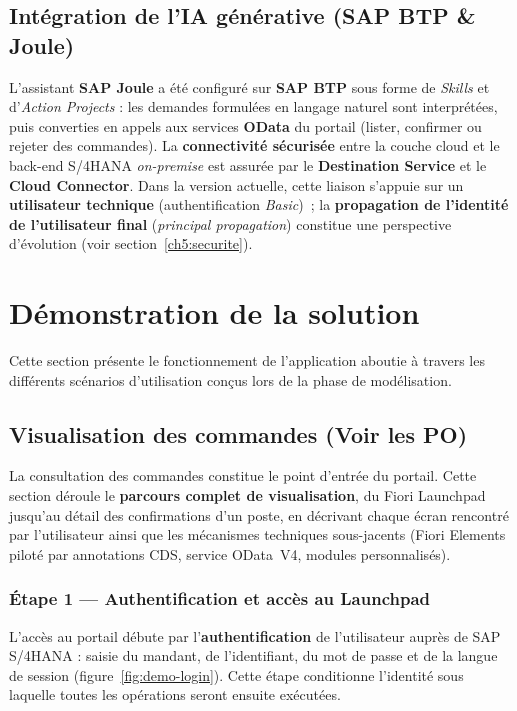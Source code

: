 \documentclass[12pt,a4paper,oneside]{report}
\begin{document}
\subsection{Intégration de l'IA générative (SAP BTP \& Joule)}\label{ch5:joule-impl}
L'assistant \textbf{SAP Joule} a été configuré sur \textbf{SAP BTP} sous forme de
\textit{Skills} et d'\textit{Action Projects} : les demandes formulées en langage naturel
sont interprétées, puis converties en appels aux services \textbf{OData} du portail
(lister, confirmer ou rejeter des commandes). La \textbf{connectivité sécurisée} entre la
couche cloud et le back-end S/4HANA \textit{on-premise} est assurée par le
\textbf{Destination Service} et le \textbf{Cloud Connector}. Dans la version actuelle,
cette liaison s'appuie sur un \textbf{utilisateur technique} (authentification \textit{Basic})~;
la \textbf{propagation de l'identité de l'utilisateur final} (\textit{principal
propagation}) constitue une perspective d'évolution (voir
section~\ref{ch5:securite}).

\section{Démonstration de la solution}\label{ch5:implementation}
Cette section présente le fonctionnement de l'application aboutie à travers les différents scénarios d'utilisation conçus lors de la phase de modélisation.

\subsection{Visualisation des commandes (Voir les PO)}\label{ch5:voir-po}
La consultation des commandes constitue le point d'entrée du portail. Cette section
déroule le \textbf{parcours complet de visualisation}, du Fiori Launchpad jusqu'au détail
des confirmations d'un poste, en décrivant chaque écran rencontré par l'utilisateur ainsi
que les mécanismes techniques sous-jacents (Fiori Elements piloté par annotations CDS,
service OData~V4, modules personnalisés).

\subsubsection{Étape 1 --- Authentification et accès au Launchpad}
L'accès au portail débute par l'\textbf{authentification} de l'utilisateur auprès de SAP
S/4HANA : saisie du mandant, de l'identifiant, du mot de passe et de la langue de session
(figure~\ref{fig:demo-login}). Cette étape conditionne l'identité sous laquelle toutes les
opérations seront ensuite exécutées.
\end{document}
